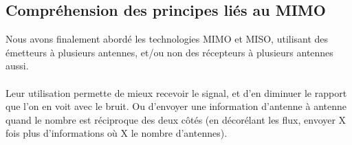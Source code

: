 \subsection{Compréhension des principes liés au MIMO}

Nous avons finalement abordé les technologies MIMO et MISO, utilisant des émetteurs à plusieurs antennes, et/ou non des récepteurs à plusieurs antennes aussi.
\\ \\
Leur utilisation permette de mieux recevoir le signal, et d'en diminuer le rapport que l'on en voit avec le bruit. Ou d'envoyer une information d'antenne à antenne quand le nombre est réciproque des deux côtés (en décorélant les flux, envoyer X fois plus d'informations où X le nombre d'antennes).
